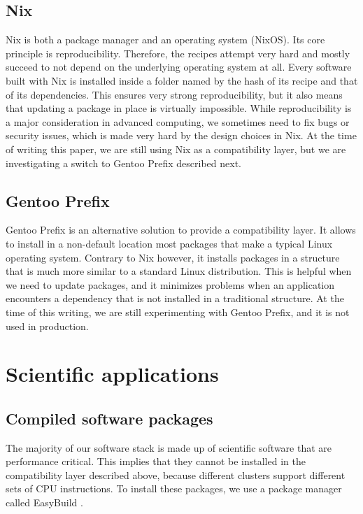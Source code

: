 \documentclass[sigconf]{acmart}
\begin{document}
\subsection{Nix}
\label{sub:Nix}
Nix \cite{Nix} is both a package manager and an operating system (NixOS). Its core principle is reproducibility.
Therefore, the recipes attempt very hard and mostly succeed to not depend on the underlying operating system at all.
Every software built with Nix is installed inside a folder named by the hash of its recipe and that of its
dependencies. This ensures very strong reproducibility, but it also means that updating a package in place is virtually
impossible. While reproducibility is a major consideration in advanced computing, we sometimes need to fix bugs or
security issues, which is made very hard by the design choices in Nix. At the time of writing this paper, we are still
using Nix as a compatibility layer, but we are investigating a switch to Gentoo Prefix described next.

\subsection{Gentoo Prefix}
\label{sub:Gentoo_Prefix}
Gentoo Prefix \cite{Gentoo} is an alternative solution to provide a compatibility layer. It allows to install in a non-default location most packages that make a typical Linux operating system. Contrary to Nix however, it installs packages in a structure that is much more similar to a standard Linux distribution. This is helpful when we need to update packages, and it minimizes problems when an application encounters a dependency that is not installed in a traditional structure. At the time of this writing, we are still experimenting with Gentoo Prefix, and it is not used in production. 

\section{Scientific applications}
\label{sec:Scientific_applications}

\subsection{Compiled software packages}
\label{sub:Compiled_software_packages}
The majority of our software stack is made up of scientific software that are performance critical. This implies that
they cannot be installed in the compatibility layer described above, because different clusters support different sets
of CPU instructions. To install these packages, we use a package manager called EasyBuild
\cite{EasyBuild2012,EasyBuild2014,EasyBuild2016}.
\end{document}
